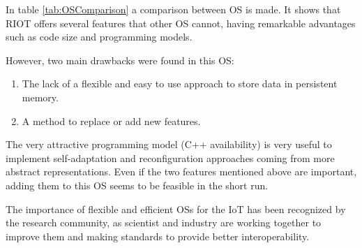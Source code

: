 In table \ref{tab:OSComparison} a comparison between OS is made.
It shows that RIOT offers several features that other OS cannot, having remarkable advantages such as code size and programming models.

However, two main drawbacks were found in this OS:
\begin{enumerate}
	\item The lack of a flexible and easy to use approach to store data in persistent memory.
	\item A method to replace or add new features.
\end{enumerate}

The very attractive programming model (C++ availability) is very useful to implement self-adaptation and reconfiguration approaches coming from more abstract representations.
Even if the two features mentioned above are important, adding them to this OS seems to be feasible in the short run.

The importance of flexible and efficient OSs for the IoT has been recognized by the research community, as scientist and industry are working together to improve them and making standards to provide better interoperability\cite{hahm2015OSIOT}.




